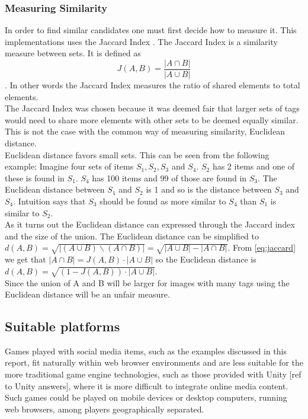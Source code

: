 \documentclass[]{article}
\begin{document}

\subsubsection{Measuring Similarity}
In order to find similar candidates one must first decide how to measure it. This implementations uses the Jaccard Index \cite{jaccard1912distribution}. The Jaccard Index is a similarity measure between sets. It is defined as
\begin{equation}
\label{eq:jaccard}
J(A,B) = \frac{|A \cap B|}{|A \cup B|}
\end{equation}
. In other words the Jaccard Index measures the ratio of shared elements to total elements.\\
The Jaccard Index was chosen because it was deemed fair that larger sets of tags would need to share more elements with other sets to be deemed equally similar. This is not the case with the common way of measuring similarity, Euclidean distance.\\
Euclidean distance favors small sets. This can be seen from the following example: Imagine four sets of items $S_1, S_2, S_3$ and $S_4$. $S_2$ has 2 items and one of these is found in $S_1$. $S_4$ has 100 items and 99 of those are found in $S_3$. The Euclidean distance between $S_1$ and $S_2$ is 1 and so is the distance between $S_3$ and $S_4$. Intuition says that $S_3$ should be found as more similar to $S_4$ than $S_1$ is similar to $S_2$.\\
As it turns out the Euclidean distance can expressed through the Jaccard index and the size of the union. The Euclidean distance can be simplified to $d(A,B) = \sqrt{|(A \cup B) \backslash (A \cap B)|} = \sqrt{|A \cup B| - |A \cap B|}$. From \autoref{eq:jaccard} we get that $|A \cap B| = J(A,B) \cdot |A \cup B|$ so the Euclidean distance is $d(A,B) = \sqrt{(1 - J(A,B)) \cdot |A \cup B|}$.\\
Since the union of A and B will be larger for images with many tags using the Euclidean distance will be an unfair measure.


\subsection{Suitable platforms}

Games played with social media items, such as the examples discussed in this report, fit naturally within web browser environments and are less suitable for the more traditional game engine technologies, such as those provided with Unity [ref to Unity answers], where it is more difficult to integrate online media content.  Such games could be played on mobile devices or desktop computers, running web browsers, among players geographically separated.  
\end{document}
